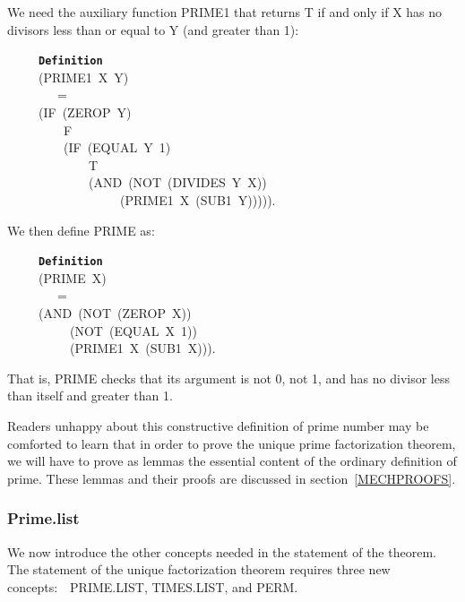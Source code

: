 \documentclass[11pt]{book}
\newenvironment{pubasis}{\begin{flushleft}\ttfamily\small}{\normalsize\rmfamily\end{flushleft}}
\newcommand{\axiomordefinition}[1]{\vspace{6pt}\texttt{\textbf{#1}}}
\newcommand{\pubdefaulttextsize}{\large}
\begin{document}
We  need the auxiliary function PRIME1 that returns T
if and only if X has no divisors less than or equal to Y (and greater than 1):
\begin{pubasis}
~~~~~\axiomordefinition{Definition}\\
~~~~~(PRIME1~X~Y)\\
~~~~~~~~=\\
~~~~~(IF~(ZEROP~Y)\\
~~~~~~~~~F\\
~~~~~~~~~(IF~(EQUAL~Y~1)\\
~~~~~~~~~~~~~T\\
~~~~~~~~~~~~~(AND~(NOT~(DIVIDES~Y~X))\\
~~~~~~~~~~~~~~~~~~(PRIME1~X~(SUB1~Y))))).\\
\end{pubasis}
We  then define PRIME as:
\begin{pubasis}
~~~~~\axiomordefinition{Definition}\\
~~~~~(PRIME~X)\\
~~~~~~~~=\\
~~~~~(AND~(NOT~(ZEROP~X))\\
~~~~~~~~~~(NOT~(EQUAL~X~1))\\
~~~~~~~~~~(PRIME1~X~(SUB1~X))).\\
\end{pubasis}
That is, PRIME checks that its argument is not 0, not 1,
and  has no divisor less than itself and greater than 1.

Readers unhappy about this constructive definition of prime number
may be comforted to learn that in order to prove the
unique prime factorization theorem, we will have to
prove as lemmas the essential content of the
ordinary  definition of prime.  These lemmas and their
proofs are discussed in section~\ref{MECHPROOFS}.
\subsubsection{Prime.list}
\label{TIMES.LIST}
\pubdefaulttextsize
We now introduce the other concepts needed
in the statement of the theorem.
The statement of the unique factorization theorem
requires three new concepts:~~PRIME.LIST,
TIMES.LIST, and PERM.
\end{document}
